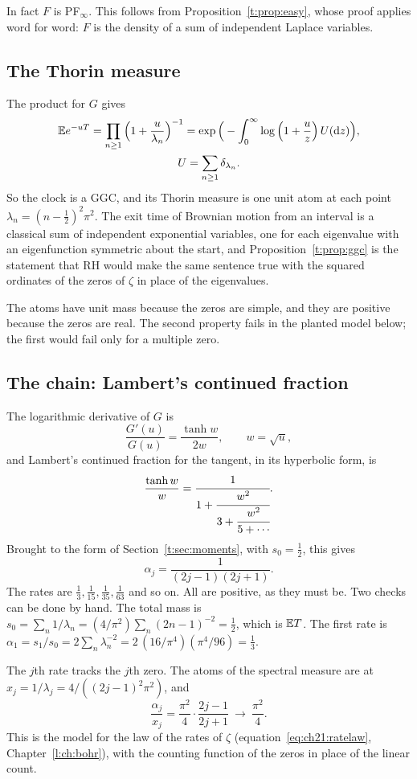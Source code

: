In fact $F$ is PF$_\infty$. This follows from Proposition~\ref{t:prop:easy}, whose proof applies word for word: $F$ is the density of a sum of independent Laplace variables.
\subsection{The Thorin measure}

The product for $G$ gives
\begin{gather*}
\mathbb{E} e^{-uT}=\prod_{n\ge1}\Big(1+\frac{u}{\lambda_n}\Big)^{-1}=\exp\Big(-\int_0^\infty\log\Big(1+\frac uz\Big)\,U(\mathrm{d} z)\Big),\\
U=\sum_{n\ge1}\delta_{\lambda_n}.
\end{gather*}
So the clock is a GGC, and its Thorin measure is one unit atom at each point $\lambda_n=(n-\frac12)^2\pi^2$. The exit time of Brownian motion from an interval is a classical sum of independent exponential variables, one for each eigenvalue with an eigenfunction symmetric about the start, and Proposition~\ref{t:prop:ggc} is the statement that RH would make the same sentence true with the squared ordinates of the zeros of $\zeta$ in place of the eigenvalues.

The atoms have unit mass because the zeros are simple, and they are positive because the zeros are real. The second property fails in the planted model below; the first would fail only for a multiple zero.

\subsection{The chain: Lambert's continued fraction}

The logarithmic derivative of $G$ is
\[
\frac{G'(u)}{G(u)}=\frac{\tanh w}{2w},\qquad w=\sqrt{u},
\]
and Lambert's continued fraction for the tangent, in its hyperbolic form, is
\[
\frac{\tanh w}{w}=\cfrac{1}{1+\cfrac{w^2}{3+\cfrac{w^2}{5+\cdots}}}.
\]
Brought to the form of Section~\ref{t:sec:moments}, with $s_0=\frac12$, this gives
\[
\alpha_j=\frac{1}{(2j-1)(2j+1)} .
\]
The rates are $\frac13,\frac1{15},\frac1{35},\frac1{63}$ and so on. All are positive, as they must be. Two checks can be done by hand. The total mass is $s_0=\sum_n1/\lambda_n=(4/\pi^2)\sum_n(2n-1)^{-2}=\frac12$, which is $\mathbb{E} T$. The first rate is $\alpha_1=s_1/s_0=2\sum_n\lambda_n^{-2}=2\,(16/\pi^4)(\pi^4/96)=\frac13$.

The $j$th rate tracks the $j$th zero. The atoms of the spectral measure are at $x_j=1/\lambda_j=4/((2j-1)^2\pi^2)$, and
\[
\frac{\alpha_j}{x_j}=\frac{\pi^2}{4}\cdot\frac{2j-1}{2j+1}\ \longrightarrow\ \frac{\pi^2}{4}.
\]
This is the model for the law of the rates of $\zeta$ (equation~\eqref{eq:ch21:ratelaw}, Chapter~\ref{l:ch:bohr}), with the counting function of the zeros in place of the linear count.

